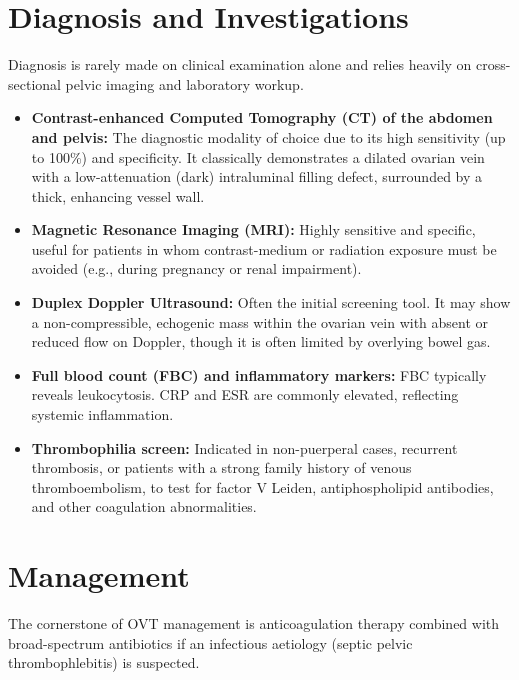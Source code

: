 \section*{Diagnosis and Investigations}
Diagnosis is rarely made on clinical examination alone and relies heavily on cross-sectional pelvic imaging and laboratory workup.

\begin{itemize}
    \item \textbf{Contrast-enhanced Computed Tomography (CT) of the abdomen and pelvis:} The diagnostic modality of choice due to its high sensitivity (up to 100\%) and specificity. It classically demonstrates a dilated ovarian vein with a low-attenuation (dark) intraluminal filling defect, surrounded by a thick, enhancing vessel wall.
    \item \textbf{Magnetic Resonance Imaging (MRI):} Highly sensitive and specific, useful for patients in whom contrast-medium or radiation exposure must be avoided (e.g., during pregnancy or renal impairment).
    \item \textbf{Duplex Doppler Ultrasound:} Often the initial screening tool. It may show a non-compressible, echogenic mass within the ovarian vein with absent or reduced flow on Doppler, though it is often limited by overlying bowel gas.
    \item \textbf{Full blood count (FBC) and inflammatory markers:} FBC typically reveals leukocytosis. CRP and ESR are commonly elevated, reflecting systemic inflammation.
    \item \textbf{Thrombophilia screen:} Indicated in non-puerperal cases, recurrent thrombosis, or patients with a strong family history of venous thromboembolism, to test for factor V Leiden, antiphospholipid antibodies, and other coagulation abnormalities.
\end{itemize}

\section*{Management}
The cornerstone of OVT management is anticoagulation therapy combined with broad-spectrum antibiotics if an infectious aetiology (septic pelvic thrombophlebitis) is suspected.

